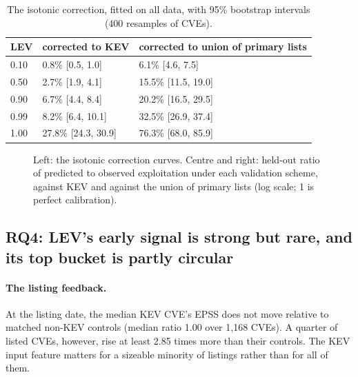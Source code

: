 \begin{table}[t]
\centering\small
\caption{The isotonic correction, fitted on all data, with 95\% bootstrap
intervals (400 resamples of CVEs).}\label{tab:curve}
\begin{tabular}{@{}lll@{}}
\toprule
LEV & corrected to KEV & corrected to union of primary lists \\
\midrule
0.10 & 0.8\% [0.5, 1.0] & 6.1\% [4.6, 7.5] \\
0.50 & 2.7\% [1.9, 4.1] & 15.5\% [11.5, 19.0] \\
0.90 & 6.7\% [4.4, 8.4] & 20.2\% [16.5, 29.5] \\
0.99 & 8.2\% [6.4, 10.1] & 32.5\% [26.9, 37.4] \\
1.00 & 27.8\% [24.3, 30.9] & 76.3\% [68.0, 85.9] \\
\bottomrule
\end{tabular}
\end{table}

\begin{figure}[t]
\centering
{}
\caption{Left: the isotonic correction curves. Centre and right: held-out ratio
of predicted to observed exploitation under each validation scheme, against KEV
and against the union of primary lists (log scale; 1 is perfect
calibration).}\label{fig:recal}
\end{figure}


\subsection{RQ4: LEV's early signal is strong but rare, and its top bucket is partly circular}\label{sec:res-leak}

\paragraph{The listing feedback.} At the listing date, the median KEV CVE's
EPSS does not move relative to matched non-KEV controls (median ratio 1.00 over
1,168 CVEs). A quarter of listed CVEs, however, rise at least 2.85 times more
than their controls. The KEV input feature matters for a sizeable minority of
listings rather than for all of them.

